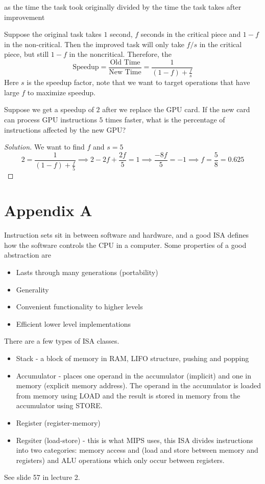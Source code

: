 \documentclass[12pt]{scrartcl}
\begin{document}
\begin{definition}
   as the time the task took originally divided by the time
  the task takes after improvement

  Suppose the original task takes $1$ second, $f$ seconds in the critical piece and $1-f$ in the non-critical. 
  Then the improved task will only take $f/s$ in the critical piece, but still $1-f$ in the noncritical. Therefore, the 
  \[\text{Speedup} = \frac{\text{Old Time}}{\text{New Time}} = \frac{1}{(1-f) +\frac{f}{s}}\]
  Here $s$ is the speedup factor, note that we want to target operations that have large $f$ to maximize speedup.
\end{definition}

\begin{example}
  Suppose we get a speedup of $2$ after we replace the GPU card. If the new card can process GPU instructions $5$ times faster, 
  what is the percentage of instructions affected by the new GPU?

  \begin{proof}[Solution]
    We want to find $f$ and $s =5$ 
    \[2 = \frac{1}{(1-f) + \frac{f}{5}} \implies 2 - 2f + \frac{2f}{5} = 1 \implies \frac{-8f}{5} = -1 \implies f = \frac{5}{8} = 0.625 \]
  \end{proof}
\end{example}

\section{Appendix A}

\begin{definition}
  Instruction sets sit in between software and hardware, and a good ISA defines how the software controls the CPU
  in a computer. Some properties of a good abstraction are 
  \begin{itemize}
    \item Lasts through many generations (portability)
    \item Generality
    \item Convenient functionality to higher levels
    \item Efficient lower level implementations
  \end{itemize}
  There are a few types of ISA classes.
  \begin{itemize}
    \item Stack - a block of memory in RAM, LIFO structure, pushing and popping
    \item Accumulator - places one operand in the accumulator (implicit) and one in memory (explicit memory address). 
    The operand in the accumulator is loaded from memory using LOAD and the result is stored in memory from the accumulator using STORE.
    \item Register (register-memory)
    \item Regsiter (load-store) - this is what MIPS uses, this ISA divides instructions into two categories: memory access and 
    (load and store between memory and registers) and ALU operations which only occur between registers. 
  \end{itemize}
\end{definition}

\begin{note}
  See slide 57 in lecture 2.
\end{note}
\end{document}
